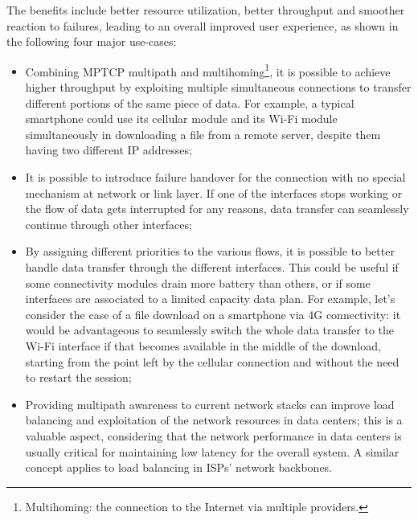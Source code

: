 The benefits include better resource utilization, better throughput and smoother reaction to failures, leading to an overall improved user experience, as shown in the following four major use-cases:
\begin{itemize}
  \item Combining MPTCP multipath and multihoming\footnote{Multihoming: the connection to the Internet via multiple providers.}, it is possible to achieve higher throughput by exploiting multiple simultaneous connections to transfer different portions of the same piece of data. For example, a typical smartphone could use its cellular module and its Wi-Fi module simultaneously in downloading a file from a remote server, despite them having two different IP addresses;
  \item It is possible to introduce failure handover for the connection with no special mechanism at network or link layer. If one of the interfaces stops working or the flow of data gets interrupted for any reasons, data transfer can seamlessly continue through other interfaces;
  \item By assigning different priorities to the various flows, it is possible to better handle data transfer through the different interfaces. This could be useful if some connectivity modules drain more battery than others, or if some interfaces are associated to a limited capacity data plan. For example, let's consider the case of a file download on a smartphone via 4G connectivity: it would be advantageous to seamlessly switch the whole data transfer to the Wi-Fi interface if that becomes available in the middle of the download, starting from the point left by the cellular connection and without the need to restart the session;
  \item Providing multipath awareness to current network stacks can improve load balancing and exploitation of the network resources in data centers; this is a valuable aspect, considering that the network performance in data centers is usually critical for maintaining low latency for the overall system. A similar concept applies to load balancing in ISPs' network backbones.
\end{itemize}


